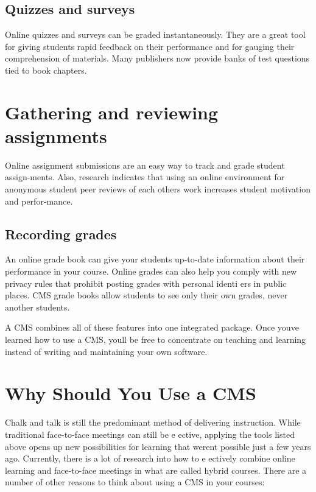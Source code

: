 \documentclass[12pt,a4paper,final,oneside]{report}
\begin{document}
\subsection{Quizzes and surveys}

Online quizzes and surveys can be graded instantaneously. They are a great tool for giving students rapid feedback on their performance and for gauging their comprehension of materials. Many publishers now provide banks of test questions tied to book chapters.

\section{Gathering and reviewing assignments}

Online assignment submissions are an easy way to track and grade student assign-ments. Also, research indicates that using an online environment for anonymous student peer reviews of each others work increases student motivation and perfor-mance.

\subsection{Recording grades}

An online grade book can give your students up-to-date information about their performance in your course. Online grades can also help you comply with new privacy rules that prohibit posting grades with personal identi ers in public places. CMS grade books allow students to see only their own grades, never another students.

A CMS combines all of these features into one integrated package. Once youve learned how to use a CMS, youll be free to concentrate on teaching and learning instead of writing and maintaining your own software.


\section{Why Should You Use a CMS}

Chalk and talk is still the predominant method of delivering instruction. While traditional face-to-face meetings can still be e ective, applying the tools listed above opens up new possibilities for learning that werent possible just a few years ago. Currently, there is a lot of research into how to e ectively combine online learning and face-to-face meetings in what are called hybrid courses. There are a number of other reasons to think about using a CMS in your courses:
\end{document}
